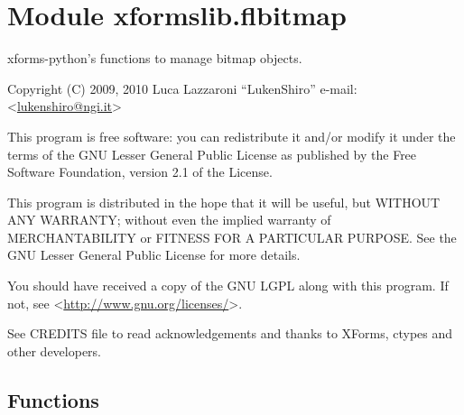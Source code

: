 %
%
%


\section{Module xformslib.flbitmap}

    \label{xformslib:flbitmap}

xforms-python's functions to manage bitmap objects.

Copyright (C) 2009, 2010  Luca Lazzaroni ``LukenShiro''
e-mail: <\href{mailto:lukenshiro@ngi.it}{lukenshiro@ngi.it}>

This program is free software: you can redistribute it and/or modify
it under the terms of the GNU Lesser General Public License as
published by the Free Software Foundation, version 2.1 of the License.

This program is distributed in the hope that it will be useful,
but WITHOUT ANY WARRANTY; without even the implied warranty of
MERCHANTABILITY or FITNESS FOR A PARTICULAR PURPOSE. See the
GNU Lesser General Public License for more details.

You should have received a copy of the GNU LGPL along with this
program. If not, see <\href{http://www.gnu.org/licenses/}{http://www.gnu.org/licenses/}>.

See CREDITS file to read acknowledgements and thanks to XForms,
ctypes and other developers.


  \subsection{Functions}

    \label{xformslib:flbitmap:fl_add_bitmap}

